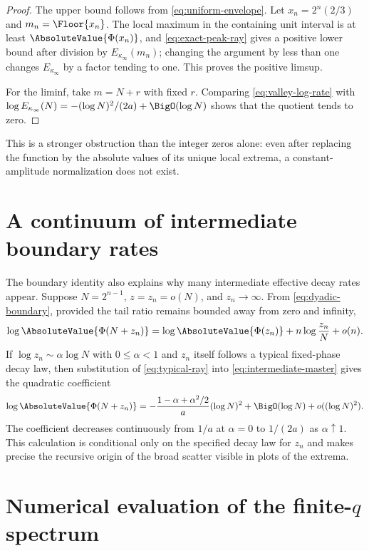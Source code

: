 \documentclass[11pt,oneside]{article}
\theoremstyle{definition}
\theoremstyle{remark}
\newcommand{\Phiup}{\Phi}
\begin{document}
\begin{proof}
The upper bound follows from \eqref{eq:uniform-envelope}.  Let
$x_n=2^n(2/3)$ and $m_n=\Floor{x_n}$.  The local maximum in the containing unit interval is
at least $\AbsoluteValue{\Phiup(x_n)}$, and \eqref{eq:exact-peak-ray} gives a positive lower bound
after division by $E_{\kappa_\infty}(m_n)$; changing the argument by less than one changes
$E_{\kappa_\infty}$ by a factor tending to one.  This proves the positive limsup.

For the liminf, take $m=N+r$ with fixed $r$.  Comparing
\eqref{eq:valley-log-rate} with
$\log E_{\kappa_\infty}(N)=-(\log N)^2/(2a)+\BigO(\log N)$ shows that the quotient tends to
zero.
\end{proof}

This is a stronger obstruction than the integer zeros alone: even after replacing the
function by the absolute values of its unique local extrema, a constant-amplitude
normalization does not exist.

\section{A continuum of intermediate boundary rates}
\label{sec:intermediate-rates}

The boundary identity also explains why many intermediate effective decay rates appear.
Suppose $N=2^{n-1}$, $z=z_n=o(N)$, and $z_n\to\infty$.  From
\eqref{eq:dyadic-boundary}, provided the tail ratio remains bounded away from zero and
infinity,
\begin{equation}
 \log\AbsoluteValue{\Phiup(N+z_n)}
 =\log\AbsoluteValue{\Phiup(z_n)}+n\log\frac{z_n}{N}+o(n).
 \label{eq:intermediate-master}
\end{equation}
If $\log z_n\sim\alpha\log N$ with $0\le\alpha<1$ and $z_n$ itself follows a typical
fixed-phase decay law, then substitution of \eqref{eq:typical-ray} into
\eqref{eq:intermediate-master} gives the quadratic coefficient
\begin{equation}
 \log\AbsoluteValue{\Phiup(N+z_n)}
 =-\frac{1-\alpha+\alpha^2/2}{a}(\log N)^2
  +\BigO(\log N)+o((\log N)^2).
 \label{eq:intermediate-quadratic}
\end{equation}
The coefficient decreases continuously from $1/a$ at $\alpha=0$ to $1/(2a)$ as
$\alpha\uparrow1$.  This calculation is conditional only on the specified decay law for
$z_n$ and makes precise the recursive origin of the broad scatter visible in plots of the
extrema.

\section{Numerical evaluation of the finite-$q$ spectrum}
\label{sec:numerics}
\end{document}
